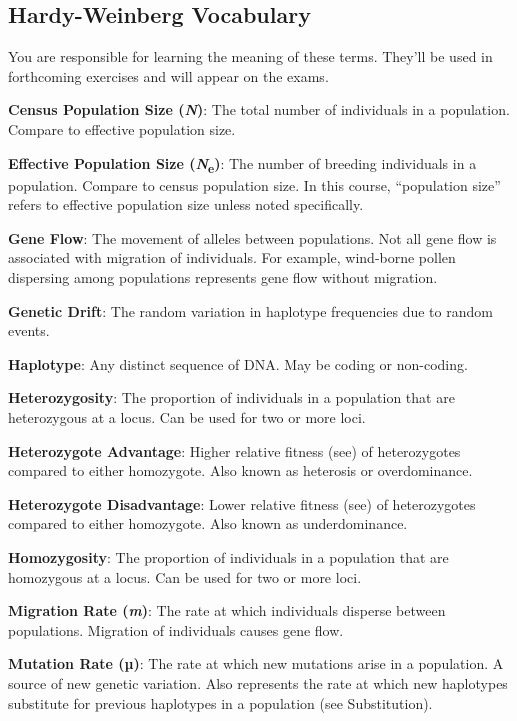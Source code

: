 \documentclass[11pt]{article}
\begin{document}
\thispagestyle{empty}
\subsection*{Hardy-Weinberg Vocabulary}

You are responsible for learning the meaning of these terms. They'll be used in forthcoming exercises and will appear on the exams.\medskip

\textbf{Census Population Size (\emph{N})}: The total number of
individuals in a population. Compare to effective population size.\medskip

\textbf{Effective Population Size (\emph{N}\textsubscript{e})}: The
number of breeding individuals in a population. Compare to census
population size. In this course, ``population size'' refers to
effective population size unless noted specifically.\medskip

\textbf{Gene Flow}: The movement of alleles between populations. Not all
gene flow is associated with migration of individuals. For example, wind-borne pollen
dispersing among populations represents gene flow without migration.\medskip

\textbf{Genetic Drift}: The random variation in haplotype frequencies
due to random events.\medskip

\textbf{Haplotype}: Any distinct sequence of DNA. May be coding or
non-coding.\medskip

\textbf{Heterozygosity}: The proportion of individuals in a population
that are heterozygous at a locus. Can be used for two or more loci.\medskip

\textbf{Heterozygote Advantage}: Higher relative fitness (see) of
heterozygotes compared to either homozygote. Also known as
heterosis or overdominance.\medskip

\textbf{Heterozygote Disadvantage}: Lower relative fitness (see) of
heterozygotes compared to either homozygote. Also known as
underdominance.\medskip

\textbf{Homozygosity}: The proportion of individuals in a population
that are homozygous at a locus. Can be used for two or more loci.\medskip

\textbf{Migration Rate (\emph{m})}: The rate at which individuals
disperse between populations. Migration of individuals causes gene flow.\medskip

\textbf{Mutation Rate (µ)}: The rate at which new mutations arise in a
population. A source of new genetic variation. Also represents the rate
at which new haplotypes substitute for previous haplotypes in a
population (see Substitution).\medskip
\end{document}
